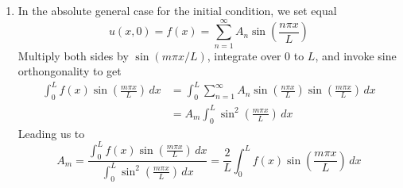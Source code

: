 \documentclass[a4paper]{article}
\begin{document}
\begin{enumerate}[label=(\alph*)]
	\begin{align*}
		A_{m} & = \frac{2}{L}\!\left[ \int^{L/2}_{0} \sin\!\left(\frac{m \pi x}{L}\right) \, dx + \int^{L}_{L/2} 2 \sin\!\left(\frac{m \pi x}{L}\right) \, dx \right] \\
		      & = -\frac{2}{L}\frac{L}{m \pi}\!\left[ \cos\!\left(\frac{m \pi x}{L}\right)\Big|^{L/2}_{0} + 2 \cos\!\left(\frac{m \pi x}{L}\right)\Big|^{L}_{L/2} \right] \\
		      & = \frac{2}{m \pi}\!\left[ 1 + \cos\!\left(\frac{m \pi}{2}\right) - 2 \cos\!\left(m \pi\right) \right]
	\end{align*}
	Unfortunately, due to the \( \cos\!\left(m \pi / 2\right) \) term and the modulo \( 4 \) arithmetic involved in evaluating it, there is no simpler algebraic expression for this Fourier coefficient. Nevertheless, it does allow us to write the complete temperature distribution:
	\[
		u \!\left( x,t \right) = \sum^{\infty}_{n=1} \frac{2}{n \pi}\!\left[ 1 + \cos\!\left(\frac{n \pi}{2}\right) - 2 \cos\!\left(n \pi\right) \right]\sin\!\left(\frac{n \pi x}{L}\right)e^{-k \!\left( n \pi / L \right)^{2}t} 
	\]
	\item In the absolute general case for the initial condition, we set equal
	\[
		u \!\left( x,0 \right) = f \!\left( x \right) = \sum^{\infty}_{n=1} A_{n}\sin\!\left(\frac{n \pi x}{L}\right) 
	\]
	Multiply both sides by \( \sin\!\left( m \pi x / L \right) \), integrate over \( 0 \) to \( L \), and invoke sine orthongonality to get
	\begin{align*}
		\int^{L}_{0} f \!\left( x \right)\sin\!\left(\frac{m \pi x}{L}\right) \, dx & = \int^{L}_{0} \sum^{\infty}_{n=1} A_{n}\sin\!\left(\frac{n \pi x}{L}\right)\sin\!\left(\frac{m \pi x}{L}\right) \, dx \\
		 & = A_{m}\int^{L}_{0} \sin^{2}\!\left(\frac{m \pi x}{L}\right) \, dx
	\end{align*}
	Leading us to
	\[
		A_{m} = \frac{\displaystyle{\int^{L}_{0} f \!\left( x \right)\sin\!\left(\frac{m \pi x}{L}\right) \, dx}}{\displaystyle{\int^{L}_{0} \sin^{2}\!\left(\frac{m \pi x}{L}\right) \, dx}} = \frac{2}{L} \int^{L}_{0} f \!\left( x \right)\sin\!\left(\frac{m \pi x}{L}\right) \, dx
	\]
\end{enumerate}

\end{document}

